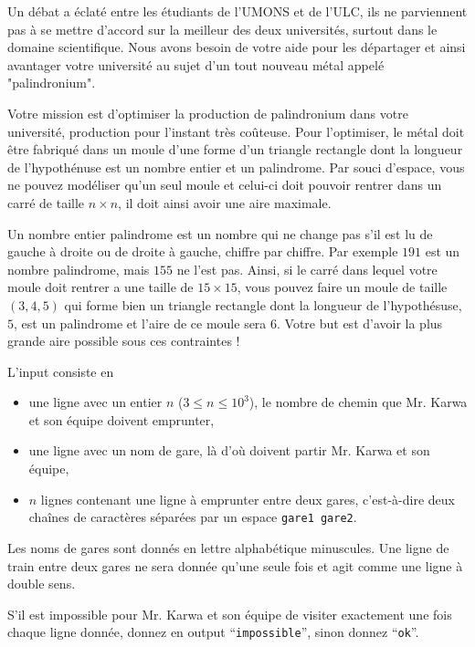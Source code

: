 \problemname{\problemyamlname}

Un débat a éclaté entre les étudiants de l'UMONS et de l'ULC, ils ne parviennent pas à se mettre d'accord sur la meilleur des deux universités, surtout dans le domaine scientifique. Nous avons besoin de votre aide pour les départager et ainsi avantager votre université au sujet d'un tout nouveau métal appelé "palindronium".

Votre mission est d'optimiser la production de palindronium dans votre université, production pour l'instant très coûteuse. Pour l'optimiser, le métal doit être fabriqué dans un moule d'une forme d'un triangle rectangle dont la longueur de l'hypothénuse est un nombre entier et un palindrome. Par souci d'espace, vous ne pouvez modéliser qu'un seul moule et celui-ci doit pouvoir rentrer dans un carré de taille $n\times n$, il doit ainsi avoir une aire maximale.

Un nombre entier palindrome est un nombre qui ne change pas s'il est lu de gauche à droite ou de droite à gauche, chiffre par chiffre. Par exemple $191$ est un nombre palindrome, mais $155$ ne l'est pas. Ainsi, si le carré dans lequel votre moule doit rentrer a une taille de $15\times 15$, vous pouvez faire un moule de taille $(3,4,5)$ qui forme bien un triangle rectangle dont la longueur de l'hypothésuse, $5$, est un palindrome et l'aire de ce moule sera $6$. Votre but est d'avoir la plus grande aire possible sous ces contraintes !

\begin{Input}
    L'input consiste en
    \begin{itemize}
        \item une ligne avec un entier $n$ ($3\leq n\leq 10^3$), le nombre de chemin que Mr. Karwa et son équipe doivent emprunter,
        \item une ligne avec un nom de gare, là d'où doivent partir Mr. Karwa et son équipe,
        \item $n$ lignes contenant une ligne à emprunter entre deux gares, c'est-à-dire deux chaînes de caractères séparées par un espace \texttt{gare1 gare2}.
    \end{itemize}
    Les noms de gares sont donnés en lettre alphabétique minuscules. Une ligne de train entre deux gares ne sera donnée qu'une seule fois et agit comme une ligne à double sens.
\end{Input}

\begin{Output}
    S'il est impossible pour Mr. Karwa et son équipe de visiter exactement une fois chaque ligne donnée, donnez en output ``\texttt{impossible}'', sinon donnez ``\texttt{ok}''.
\end{Output}
